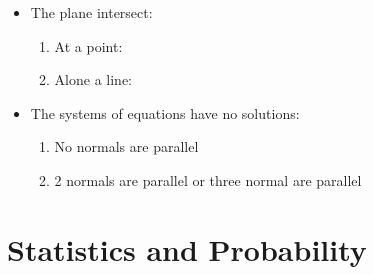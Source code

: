 \documentclass[12pt, a4paper]{article}
\begin{document}
\begin{enumerate}
\begin{itemize}
    \item The plane intersect: 
    \begin{enumerate}
      \item At a point: {\color{green}{the system of equations will have a unique solution.}}
      \item Alone a line: {\color{green}{the system of equations will have infinitely many solutions}}
    \end{enumerate}
    \item The systems of equations have no solutions: 
    \begin{enumerate}
      \item No normals are parallel {\color{green}{(the planes from a prism)}}
      \item 2 normals are parallel or three normal are parallel {\color{green}{(the planes are parallel)}}
    \end{enumerate}
  \end{itemize}
\end{enumerate}

\newpage
\section{Statistics and Probability}
\end{document}
